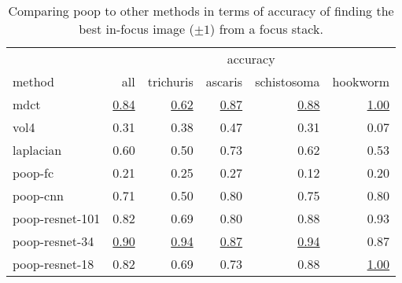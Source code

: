 \begin{table}
    \centering
    \caption{Comparing \acs{poop} to other methods in terms of accuracy of finding the best in-focus image ($\pm 1$) from a focus stack.}
    \begin{tabular}{lrrrrr}
        \hline
        \multicolumn{1}{c}{} & \multicolumn{5}{c}{accuracy} \\
        \cline{2-6}
        method & all & trichuris & ascaris & schistosoma & hookworm \\
        \hline
        \acs{mdct}                      & \underline{0.84} & \underline{0.62} & \underline{0.87} & \underline{0.88} & \underline{1.00} \\
        \acs{vol4}                      & 0.31 & 0.38 & 0.47 & 0.31 & 0.07 \\
        \acs{laplacian}                 & 0.60 & 0.50 & 0.73 & 0.62 & 0.53 \\
        \hline
        \acs{poop}-\acs{fc}             & 0.21 & 0.25 & 0.27 & 0.12 & 0.20 \\
        \acs{poop}-\acs{cnn}            & 0.71 & 0.50 & 0.80 & 0.75 & 0.80 \\
        \acs{poop}-\acs{resnet}-101     & 0.82 & 0.69 & 0.80 & 0.88 & 0.93 \\
        \acs{poop}-\acs{resnet}-34      & \underline{0.90} & \underline{0.94} & \underline{0.87} & \underline{0.94} & 0.87 \\
        \acs{poop}-\acs{resnet}-18      & 0.82 & 0.69 & 0.73 & 0.88 & \underline{1.00} \\ 
    \end{tabular}
    \label{tab:Results:Comparison:RelatedWorks:Accuracy}
\end{table}

